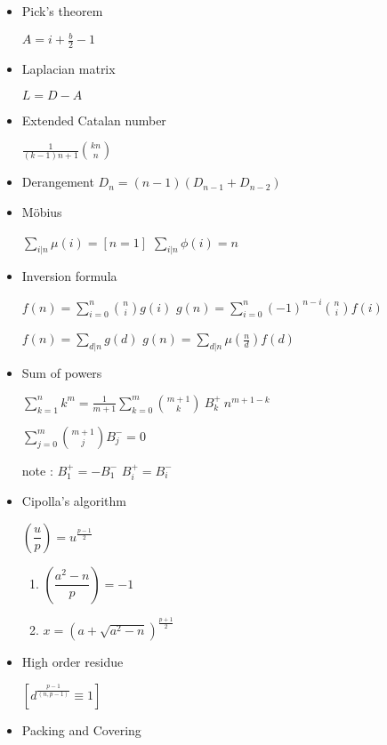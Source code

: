 \begin{itemize}

    \item Pick's theorem

    $A=i+\frac{b}{2}-1$

    \item Laplacian matrix

    $L = D - A$

    \item Extended Catalan number

    $\frac{1}{(k-1)n+1} {kn\choose n}$

    \item Derangement
    $D_n=(n-1)(D_{n-1}+D_{n-2})$

    \item Möbius

    $\sum\limits_{i|n} \mu(i)=[n=1]$
    $\sum\limits_{i|n} \phi(i)=n$

    \item Inversion formula

    $f(n)=\sum\limits_{i=0}^n{n \choose i}g(i)$
    $g(n)=\sum\limits_{i=0}^n(-1)^{n-i}{n \choose i}f(i)$

    $f(n)=\sum\limits_{d|n}g(d)$
    $g(n)=\sum\limits_{d|n}\mu(\frac{n}{d})f(d)$

    \item Sum of powers

    $\sum_{k=1}^{n} k^m=\frac{1}{m+1}\sum_{k=0}^{m}{{m+1}\choose{k}}~B^+_k~n^{m+1-k}$

    $\sum_{j=0}^{m}{m+1\choose j}B^-_j=0$

    note :
    $B^+_1=-B^-_1$
    $B^+_i=B^-_i$

    \item Cipolla's algorithm

    $\left(\dfrac{u}{p}\right)=u^{\frac{p-1}{2}}$

    \begin{enumerate}
        \item $\left(\dfrac{a^2-n}{p}\right)=-1$
        \item $x=(a+\sqrt{a^2-n})^{\frac{p+1}{2}}$
    \end{enumerate}

    \item High order residue

    $[d^{\frac{p-1}{(n,p-1)}}\equiv 1]$

    \item Packing and Covering


\end{itemize}
